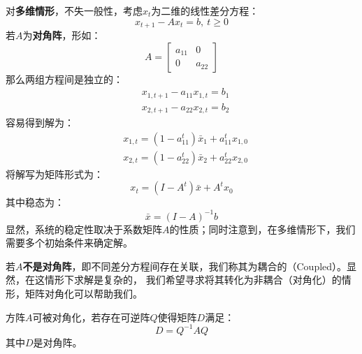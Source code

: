 对\textbf{多维情形}，不失一般性，考虑$x_t$为二维的线性差分方程：
\begin{equation*}
    x_{t+1} - Ax_t = b, ~t\geq 0
\end{equation*}
若$A$为\textbf{对角阵}，形如：
\[
    A = 
    \begin{bmatrix}
        a_{11} & 0 \\
        0 & a_{22}
    \end{bmatrix}
\]
那么两组方程间是独立的：
\begin{equation*}
    \begin{aligned}
        & x_{1, t+1}-a_{11} x_{1, t}=b_1 \\
        & x_{2, t+1}-a_{22} x_{2, t}=b_2
    \end{aligned}
\end{equation*}
容易得到解为：
\begin{equation*}
    \begin{aligned}
        & x_{1, t}=\left(1-a_{11}^t\right) \bar{x}_1+a_{11}^t x_{1,0} \\
        & x_{2, t}=\left(1-a_{22}^t\right) \bar{x}_2+a_{22}^t x_{2,0}
    \end{aligned}
\end{equation*}
将解写为矩阵形式为：
\begin{equation*}
    x_t=\left(I-A^t\right) \bar{x}+A^t x_0
\end{equation*}
其中稳态为：
\begin{equation*}
    \bar{x} = \left(I-A\right)^{-1}b
\end{equation*}
显然，系统的稳定性取决于系数矩阵$A$的性质；同时注意到，在多维情形下，我们需要多个初始条件来确定解。

若$A$\textbf{不是对角阵}，即不同差分方程间存在关联，我们称其为耦合的（Coupled）。显然，在这情形下求解是复杂的，
我们希望寻求将其转化为非耦合（对角化）的情形，矩阵对角化可以帮助我们。
\begin{lemma}
    方阵$A$可被对角化，若存在可逆阵$Q$使得矩阵$D$满足：
    \begin{equation*}
        D = Q^{-1}AQ
    \end{equation*}
    其中$D$是对角阵。
\end{lemma}

